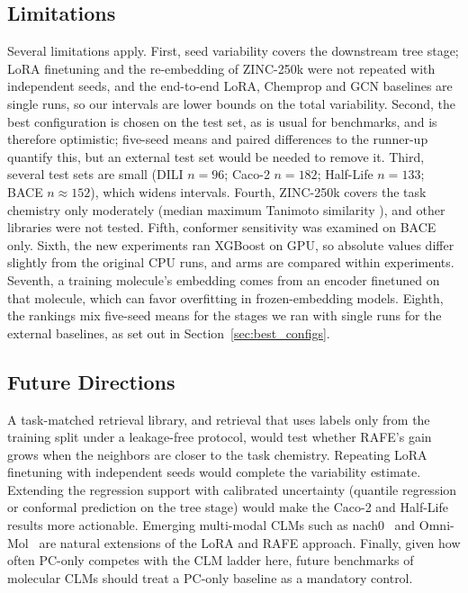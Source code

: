 \documentclass[pdflatex,sn-mathphys-num]{sn-jnl}%
\begin{document}
\subsection{Limitations}\label{sec:limitations}
Several limitations apply. First, seed variability covers the downstream tree stage; LoRA finetuning and the re-embedding of ZINC-250k were not repeated with independent seeds, and the end-to-end LoRA, Chemprop and GCN baselines are single runs, so our intervals are lower bounds on the total variability. Second, the best configuration is chosen on the test set, as is usual for benchmarks, and is therefore optimistic; five-seed means and paired differences to the runner-up quantify this, but an external test set would be needed to remove it. Third, several test sets are small (DILI $n=96$; Caco-2 $n=182$; Half-Life $n=133$; BACE $n\approx152$), which widens intervals. Fourth, ZINC-250k covers the task chemistry only moderately (median maximum Tanimoto similarity \covmedian{}), and other libraries were not tested. Fifth, conformer sensitivity was examined on BACE only. Sixth, the new experiments ran XGBoost on GPU, so absolute values differ slightly from the original CPU runs, and arms are compared within experiments. Seventh, a training molecule's embedding comes from an encoder finetuned on that molecule, which can favor overfitting in frozen-embedding models. Eighth, the rankings mix five-seed means for the stages we ran with single runs for the external baselines, as set out in Section~\ref{sec:best_configs}.

\subsection{Future Directions}\label{sec:future_work}
A task-matched retrieval library, and retrieval that uses labels only from the training split under a leakage-free protocol, would test whether RAFE's gain grows when the neighbors are closer to the task chemistry. Repeating LoRA finetuning with independent seeds would complete the variability estimate. Extending the regression support with calibrated uncertainty (quantile regression or conformal prediction on the tree stage) would make the Caco-2 and Half-Life results more actionable. Emerging multi-modal CLMs such as nach0~\cite{livne2024nach0} and Omni-Mol~\cite{hu2025omnimol} are natural extensions of the LoRA and RAFE approach. Finally, given how often PC-only competes with the CLM ladder here, future benchmarks of molecular CLMs should treat a PC-only baseline as a mandatory control.
\end{document}
